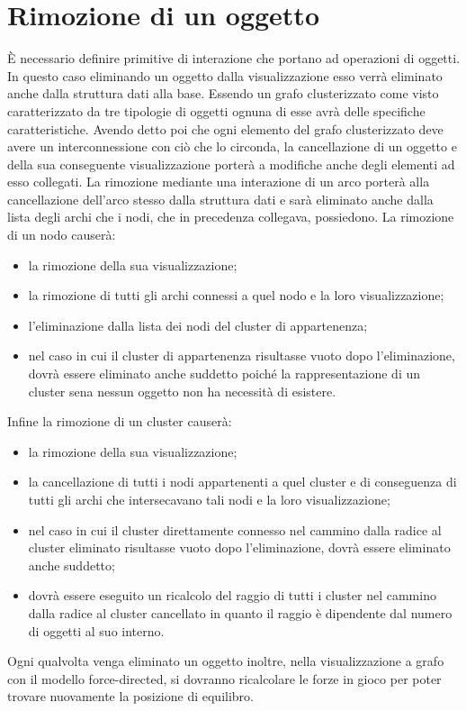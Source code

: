 {\section{Rimozione di un oggetto}
È necessario definire primitive di interazione che portano ad operazioni di oggetti. In questo caso eliminando un oggetto dalla visualizzazione esso verrà eliminato anche dalla struttura dati alla base. Essendo un grafo clusterizzato come visto caratterizzato da tre tipologie di oggetti ognuna di esse avrà delle specifiche caratteristiche. 
Avendo detto poi che ogni elemento del grafo clusterizzato deve avere un interconnessione con ciò che lo circonda, la cancellazione di un oggetto e della sua conseguente visualizzazione porterà a modifiche anche degli elementi ad esso collegati.
La rimozione mediante una interazione di un arco porterà alla cancellazione dell'arco stesso dalla struttura dati e sarà eliminato anche dalla lista degli archi che i nodi, che in precedenza collegava, possiedono.
La rimozione di un nodo causerà:
\begin{itemize}
	\item la rimozione della sua visualizzazione;
	\item la rimozione di tutti gli archi connessi a quel nodo e la loro visualizzazione;
	\item l'eliminazione dalla lista dei nodi del cluster di appartenenza;
	\item nel caso in cui il cluster di appartenenza risultasse vuoto dopo l'eliminazione, dovrà essere eliminato anche suddetto poiché la rappresentazione di un cluster sena nessun oggetto non ha necessità di esistere.
\end{itemize}
Infine la rimozione di un cluster causerà:
\begin{itemize}
	\item la rimozione della sua visualizzazione;
	\item la cancellazione di tutti i nodi appartenenti a quel cluster e di conseguenza di tutti gli archi che intersecavano tali nodi e la loro visualizzazione;
	\item nel caso in cui il cluster direttamente connesso nel cammino dalla radice al cluster eliminato risultasse vuoto dopo l'eliminazione, dovrà essere eliminato anche suddetto;
	\item dovrà essere eseguito un ricalcolo del raggio di tutti i cluster nel cammino dalla radice al cluster cancellato in quanto il raggio è dipendente dal numero di oggetti al suo interno.
\end{itemize}
Ogni qualvolta venga eliminato un oggetto inoltre, nella visualizzazione a grafo con il modello force-directed, si dovranno ricalcolare le forze in gioco per poter trovare nuovamente la posizione di equilibro.

}
